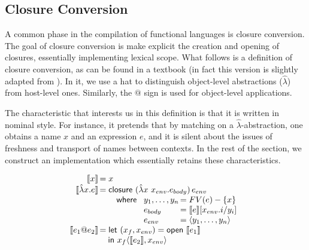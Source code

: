 \documentclass[9pt,preprint,authoryear]{sigplanconf}
\begin{document}
\subsection{Closure Conversion\label{closureSec}}

%
A common phase in the compilation of functional languages is closure conversion. 
    The goal of closure conversion is make explicit the creation and opening of closures, 
    essentially implementing lexical scope. 
    What follows is a definition of closure conversion, as can be found in a textbook 
    (in fact this version is slightly adapted from \citet{guillemette_type-preserving_2007}).
    In it, we use a hat to distinguish
    object-level abstractions ($ \hat\lambda $) from host-level ones.
    Similarly, the $ @ $ sign is used for object-level applications. %


%
    The characteristic that interests us in this definition is that it is written in nominal style.
    For instance, it pretends that by matching on a $ \hat \lambda $-abstraction, one obtains a name
    $ x $ and an expression $ e $, and it is silent about the issues of freshness and
    transport of names between contexts. In the rest of the section, we construct an
    implementation which essentially retains
    these characteristics.


\[ 
\begin{array}{r@{\,}l}
  \llbracket x \rrbracket &= x \\
  \llbracket \hat\lambda x. e \rrbracket &= \mathsf{closure}~(\hat\lambda x~x_\mathnormal{env}. e_\mathnormal{body})\, e_\mathnormal{env} \\
                                         &\quad \quad \mathsf{where}~\begin{array}[t]{l@{\,}l}
                                                                  y_1,\ldots,y_n & = FV(e)-\{x\} \\
                                                                  e_\mathnormal{body} & = \llbracket e \rrbracket[x_{env}.i/y_i] \\
                                                                  e_\mathnormal{env} & = \langle y_1,\ldots,y_n \rangle
                                                               \end{array}\\
  \llbracket e_1@e_2 \rrbracket &= \mathsf{let}~(x_f,x_\mathnormal{env}) = \mathsf{open}~\llbracket e_1 \rrbracket \\
                                &\quad \mathsf{in}~ x_f \langle \llbracket e_2 \rrbracket , x_\mathnormal{env} \rangle
\end{array} \]
\end{document}
